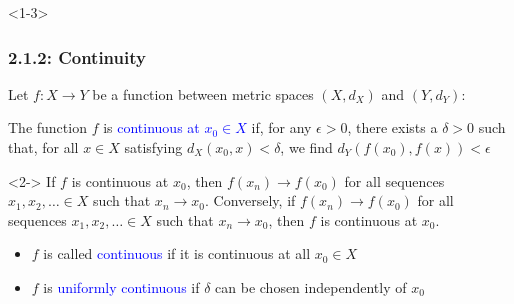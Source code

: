 \documentclass[10pt,english,aspectratio=169]{beamer}
\begin{document}
\begin{frame}<1-3>
\frametitle{2.1.2: Continuity}

Let $f \colon X \rightarrow Y$ be a function between metric spaces $(X,d_X)$ and $(Y,d_Y)$:

\begin{definition}
The function $f$ is \textcolor{blue}{continuous at $x_0 \in X$} if, for any $\epsilon> 0$, there exists a $\delta >0$ such that, for all $x\in X$ satisfying $d_X(x_0,x)< \delta$, we find $d_Y \left( f(x_0),f(x) \right) < \epsilon$
\end{definition}

\begin{theorem}<2-> 
If $f$ is continuous at $x_0$, then $f(x_n) \to f(x_0)$ for all sequences $x_1,x_2,\ldots \in X$ such that $x_n \to x_0$.
Conversely, if $f(x_n) \to f(x_0)$ for all sequences $x_1,x_2,\ldots  \in X$ such that $x_n \to x_0$, then $f$ is continuous at $x_0$.
\end{theorem}

\begin{itemize}
\setlength\itemsep{1.5mm}
\item<3-> $f$ is called \textcolor{blue}{continuous} if it is continuous at all $x_0 \in X$
\item<3-> $f$ is \textcolor{blue}{uniformly continuous} if $\delta$ can be chosen independently of $x_0$
\end{itemize}



\end{frame}
\end{document}
